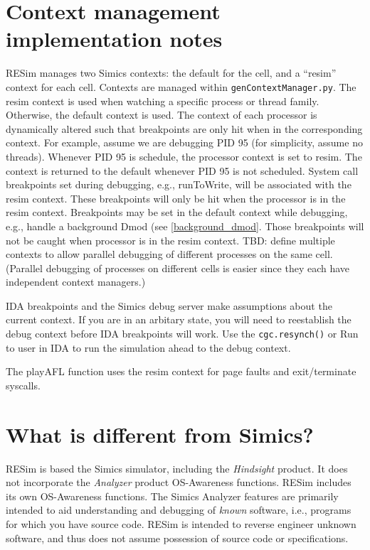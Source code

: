 \documentclass[titlepage]{article}
\begin{document}
\begin{appendices}
\section{Context management implementation notes}
RESim manages two Simics contexts: the default for the cell, and a ``resim'' context for each cell.
Contexts are managed within {\tt genContextManager.py}. The resim context is used when watching a specific process
or thread family.  Otherwise, the default context is used.  The context of each processor is dynamically altered 
such that breakpoints are only hit when in the corresponding context.  For example, assume we are debugging PID 95
(for simplicity, assume no threads).
Whenever PID 95 is schedule, the processor context is set to resim.  The context is returned to the default whenever
PID 95 is not scheduled.  System call breakpoints set during debugging, e.g., runToWrite, will be associated
with the resim context.  These breakpoints will only be hit when the processor is in the resim context. 
Breakpoints may be set in the default context while debugging, e.g., handle a background Dmod (see \ref{background_dmod}.  Those
breakpoints will not be caught when processor is in the resim context.
TBD: define multiple contexts to allow parallel debugging of different processes on the same cell.  (Parallel 
debugging of processes on different cells is easier since they each have independent context managers.)

IDA breakpoints and the Simics debug server make assumptions about the current context.  If you are in an arbitary state, 
you will need to reestablish the debug context before IDA breakpoints will work.
Use the {\tt cgc.resynch()} or Run to user in IDA to run the simulation ahead to the debug context.

The playAFL function uses the resim context for page faults and exit/terminate syscalls.


\section{What is different from Simics?}
RESim is based the Simics simulator, including the \textit{Hindsight} product.  It does not incorporate the \textit{Analyzer} product
OS-Awareness functions.  RESim includes its own OS-Awareness functions.  The Simics Analyzer features are primarily intended to aid
understanding and debugging of \textit{known} software, i.e., programs for which you have source code.  RESim is intended to reverse
engineer unknown software, and thus does not assume possession of source code or specifications.


\end{appendices}
\end{document}

